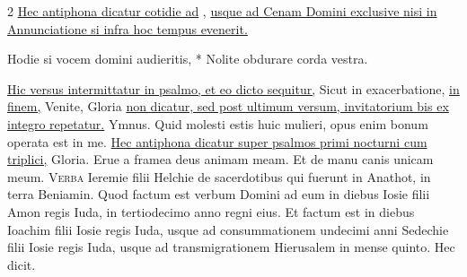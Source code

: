 \begin{multicols*}{2}
\newline \ul{Hec antiphona dicatur cotidie ad} , \ul{usque ad Cenam Domini exclusive nisi in Annunciatione si infra hoc tempus evenerit.}
\begin{invitatory}
{Hodie si vocem domini audieritis, * Nolite obdurare corda vestra.}
\end{invitatory}
\newline \ul{Hic versus intermittatur in psalmo, et eo dicto sequitur,} Sicut in exacerbatione, \ul{in finem,} Venite, Gloria \ul{non dicatur, sed post ultimum versum, invitatorium bis ex integro repetatur.} {\color{Red} Ymnus.}
 Quid molesti estis huic mulieri, opus enim bonum operata est in me.%
\newline \ul{Hec antiphona dicatur super psalmos primi nocturni cum triplici,} Gloria.
\newline \V Erue a framea deus animam meam. \R Et de manu canis unicam meum.
\lettrine[lines=2]{\zallmancaps \color{Red} V}{erba} Ieremie filii Helchie de sacerdotibus qui fuerunt in Anathot, in terra Beniamin. Quod factum est verbum Domini ad eum in diebus Iosie filii Amon regis Iuda, in tertiodecimo anno regni eius. Et factum est in diebus Ioachim filii Iosie regis Iuda, usque ad consummationem undecimi anni Sedechie filii Iosie regis Iuda, usque ad transmigrationem Hierusalem in mense quinto. Hec dicit. \R

\end{multicols*}
